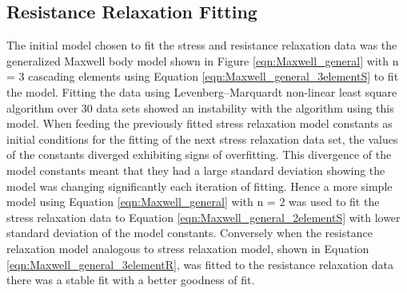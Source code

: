 \subsection{Resistance Relaxation Fitting}
The initial model chosen to fit the stress and resistance relaxation data was the generalized Maxwell body model shown in Figure \ref{eqn:Maxwell_general} with n = 3 cascading elements using Equation \ref{eqn:Maxwell_general_3elementS} to fit the model. Fitting the data using Levenberg–Marquardt non-linear least square algorithm over 30 data sets showed an instability with the algorithm using this model. When feeding the previously fitted stress relaxation model constants as initial conditions for the fitting of the next stress relaxation data set, the values of the constants diverged exhibiting signs of overfitting. This divergence of the model constants meant that they had a large standard deviation showing the model was changing significantly each iteration of fitting. Hence a more simple model using Equation \ref{eqn:Maxwell_general} with n = 2 was used to fit the stress relaxation data to Equation \ref{eqn:Maxwell_general_2elementS} with lower standard deviation of the model constants. Conversely when the resistance relaxation model analogous to stress relaxation model, shown in Equation \ref{eqn:Maxwell_general_3elementR}, was fitted to the resistance relaxation data there was a stable fit with a better goodness of fit.

